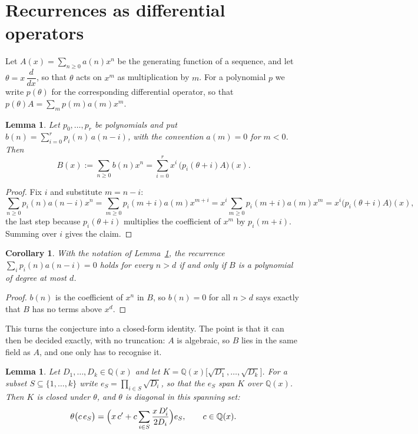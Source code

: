 \documentclass[11pt,a4paper]{article}
\theoremstyle{plain}
\newtheorem{lemma}[theorem]{Lemma}
\newtheorem{corollary}[theorem]{Corollary}
\theoremstyle{definition}
\begin{document}
\section{Recurrences as differential operators}

Let $A(x)=\sum_{n\ge0}a(n)x^{n}$ be the generating function of a sequence, and let
$\theta=x\,\dfrac{d}{dx}$, so that $\theta$ acts on $x^{m}$ as multiplication by $m$. For a
polynomial $p$ we write $p(\theta)$ for the corresponding differential operator, so that
$p(\theta)A=\sum_{m}p(m)a(m)x^{m}$.

\begin{lemma}\label{lem:transfer}
Let $p_{0},\dots,p_{r}$ be polynomials and put $b(n)=\sum_{i=0}^{r}p_{i}(n)\,a(n-i)$, with
the convention $a(m)=0$ for $m<0$. Then
\[
B(x):=\sum_{n\ge0}b(n)x^{n}=\sum_{i=0}^{r}x^{i}\,\bigl(p_{i}(\theta+i)A\bigr)(x).
\]
\end{lemma}

\begin{proof}
Fix $i$ and substitute $m=n-i$:
\[
\sum_{n\ge0}p_{i}(n)a(n-i)x^{n}=\sum_{m\ge0}p_{i}(m+i)a(m)x^{m+i}
=x^{i}\sum_{m\ge0}p_{i}(m+i)a(m)x^{m}=x^{i}\bigl(p_{i}(\theta+i)A\bigr)(x),
\]
the last step because $p_{i}(\theta+i)$ multiplies the coefficient of $x^{m}$ by
$p_{i}(m+i)$. Summing over $i$ gives the claim.
\end{proof}

\begin{corollary}\label{cor:criterion}
With the notation of Lemma~\ref{lem:transfer}, the recurrence
$\sum_{i}p_{i}(n)a(n-i)=0$ holds for every $n>d$ if and only if $B$ is a polynomial of
degree at most $d$.
\end{corollary}

\begin{proof}
$b(n)$ is the coefficient of $x^{n}$ in $B$, so $b(n)=0$ for all $n>d$ says exactly that
$B$ has no terms above $x^{d}$.
\end{proof}

This turns the conjecture into a closed-form identity. The point is that it can then be
decided exactly, with no truncation: $A$ is algebraic, so $B$ lies in the same field as
$A$, and one only has to recognise it.

\begin{lemma}\label{lem:field}
Let $D_{1},\dots,D_{k}\in\mathbb{Q}(x)$ and let
$K=\mathbb{Q}(x)\bigl[\sqrt{D_{1}},\dots,\sqrt{D_{k}}\bigr]$. For a subset
$S\subseteq\{1,\dots,k\}$ write $e_{S}=\prod_{i\in S}\sqrt{D_{i}}$, so that the $e_{S}$
span $K$ over $\mathbb{Q}(x)$. Then $K$ is closed under $\theta$, and $\theta$ is diagonal
in this spanning set:
\[
\theta\bigl(c\,e_{S}\bigr)=\Bigl(x\,c'+c\sum_{i\in S}\frac{x\,D_{i}'}{2D_{i}}\Bigr)e_{S},
\qquad c\in\mathbb{Q}(x).
\]
\end{lemma}
\end{document}
